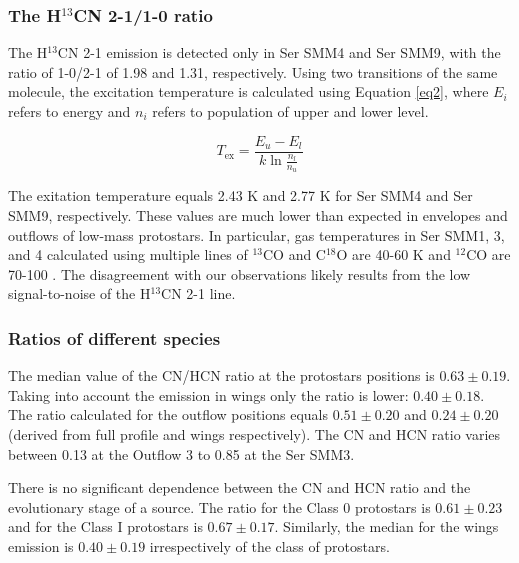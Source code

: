 \documentclass{aa}
\begin{document}

\subsubsection{The H$^{13}$CN 2-1/1-0 ratio}
The H$^{13}$CN 2-1 emission is detected only in Ser SMM4 and Ser SMM9, with the ratio of 1-0/2-1 of 1.98 and 1.31, respectively.
Using two transitions of the same molecule, the excitation temperature is calculated using Equation \ref{eq2}, where $E_i$ refers to energy
and $n_i$ refers to population of upper and lower level.

\begin{equation} 
\label{eq2} 
T_{\mathrm{ex}} = \frac{E_u - E_l}{k \ln \frac{n_l}{n_u}} 
\end{equation}

The exitation temperature equals 2.43 K and 2.77 K for Ser SMM4 and Ser SMM9, respectively. 
These values are much lower than expected in envelopes and outflows of low-mass protostars. In particular,
gas temperatures in Ser SMM1, 3, and 4 calculated using multiple lines of $^{13}$CO and C$^{18}$O are 40-60 K 
and $^{12}$CO are 70-100 \citep{Yil12,Yil13}. The disagreement with our observations likely 
results from the low signal-to-noise of the H$^{13}$CN 2-1 line. 

\subsubsection{Ratios of different species}
 
The median value of the CN/HCN ratio at the protostars positions is $0.63 \pm 0.19$. Taking into account the emission in wings only the ratio is lower: $0.40 \pm 0.18$. The ratio calculated for the outflow positions equals $0.51 \pm 0.20$ and $0.24 \pm 0.20$ (derived from full profile and wings respectively). 
The CN and HCN ratio varies between 0.13 at the Outflow 3 to 0.85 at the Ser SMM3. 

There is no significant dependence between the CN and HCN ratio and the evolutionary stage of a source. The ratio for the
Class 0 protostars is $0.61 \pm 0.23$ and for the Class I protostars is $0.67 \pm 0.17$. Similarly, the median for the wings emission is $0.40 \pm 0.19$ irrespectively of the class of protostars.
\end{document}
